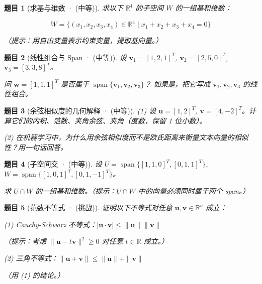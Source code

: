 \documentclass[12pt]{ctexart}
\newtheorem{problem}{题目}
\begin{document}
\begin{problem}[求基与维数 · (中等)]
求以下 $\mathbb{R}^4$ 的子空间 $W$ 的一组基和维数：

\[
W = \{(x_1, x_2, x_3, x_4) \in \mathbb{R}^4 \mid x_1 + x_2 + x_3 + x_4 = 0\}
\]

（提示：用自由变量表示约束变量，提取基向量。）
\end{problem}




\begin{problem}[线性组合与 Span · (中等)]
设 $\mathbf{v}_1 = [1, 2, 1]^T$, $\mathbf{v}_2 = [2, 5, 0]^T$, $\mathbf{v}_3 = [3, 3, 8]^T$。

问 $\mathbf{w} = [1, 1, 1]^T$ 是否属于 $\operatorname{span}\{\mathbf{v}_1, \mathbf{v}_2, \mathbf{v}_3\}$？
如果是，把它写成 $\mathbf{v}_1, \mathbf{v}_2, \mathbf{v}_3$ 的线性组合。
\end{problem}




\begin{problem}[余弦相似度的几何解释 · (中等)]
(1) 设 $\mathbf{u} = [1, 2]^T$, $\mathbf{v} = [4, -2]^T$。计算它们的内积、范数、夹角余弦、夹角（度数，保留 1 位小数）。

(2) 在机器学习中，为什么用余弦相似度而不是欧氏距离来衡量文本向量的相似性？用一句话回答。

\end{problem}







\begin{problem}[子空间交 · (中等)]
设 $U = \operatorname{span}\{[1, 1, 0]^T, [0, 1, 1]^T\}$, $W = \operatorname{span}\{[1, 0, 1]^T, [0, 1, -1]^T\}$。

求 $U \cap W$ 的一组基和维数。（提示：$U \cap W$ 中的向量必须同时属于两个 span。）
\end{problem}




\begin{problem}[范数不等式 · (挑战)]
证明以下不等式对任意 $\mathbf{u}, \mathbf{v} \in \mathbb{R}^n$ 成立：

(1) Cauchy-Schwarz 不等式：$|\mathbf{u} \cdot \mathbf{v}| \leq \|\mathbf{u}\| \|\mathbf{v}\|$

（提示：考虑 $\|\mathbf{u} - t\mathbf{v}\|^2 \geq 0$ 对任意 $t \in \mathbb{R}$ 成立。）

(2) 三角不等式：$\|\mathbf{u} + \mathbf{v}\| \leq \|\mathbf{u}\| + \|\mathbf{v}\|$

（用 (1) 的结论。）
\end{problem}
\end{document}
